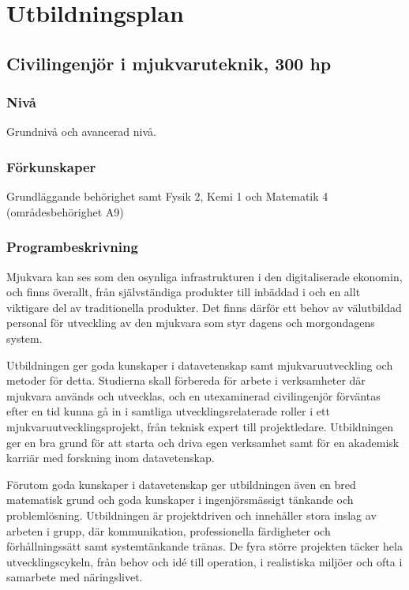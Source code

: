 \chapter{Utbildningsplan\label{app:utbplan}}

\section*{Civilingenjör i mjukvaruteknik, 300 hp}

\subsection*{Nivå}

Grundnivå och avancerad nivå.

\subsection*{Förkunskaper}

Grundläggande behörighet samt Fysik 2, Kemi 1 och Matematik 4
(områdesbehörighet A9)

\subsection*{Programbeskrivning}

Mjukvara kan ses som den osynliga infrastrukturen i den digitaliserade
ekonomin, och finns överallt, från självständiga produkter till inbäddad
i och en allt viktigare del av traditionella produkter. Det finns därför
ett behov av välutbildad personal för utveckling av den mjukvara som
styr dagens och morgondagens system.

Utbildningen ger goda kunskaper i datavetenskap samt mjukvaruutveckling och metoder för detta. Studierna skall
förbereda för arbete i verksamheter där mjukvara används och
utvecklas, och en utexaminerad civilingenjör förväntas efter en tid kunna
gå in i samtliga utvecklingsrelaterade roller i ett
mjukvaruutvecklingsprojekt, från teknisk expert till projektledare.
Utbildningen ger en bra grund för att starta och driva egen
verksamhet samt för en akademisk karriär med forskning inom datavetenskap.

Förutom goda kunskaper i datavetenskap ger utbildningen även en bred
matematisk grund och goda kunskaper i ingenjörsmässigt tänkande och
problemlösning. Utbildningen är projektdriven och innehåller stora
inslag av arbeten i grupp, där kommunikation, professionella
färdigheter och förhållningssätt samt systemtänkande tränas. De fyra
större projekten täcker hela utvecklingscykeln, från behov och idé till
operation, i realistiska miljöer och ofta i samarbete med näringslivet.

